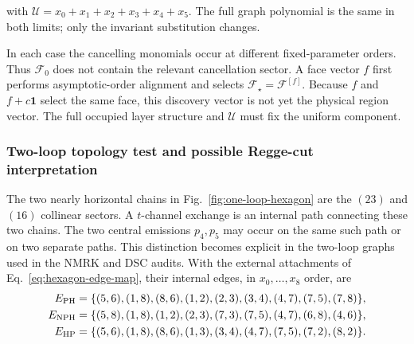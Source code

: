 \documentclass[a4paper,11pt]{article}
\begin{document}
with \(\mathcal U=x_0+x_1+x_2+x_3+x_4+x_5\).  The full graph polynomial is
the same in both limits; only the invariant substitution changes.

In each case the cancelling monomials occur at different fixed-parameter
orders.  Thus \(\mathcal F_0\) does not contain the relevant cancellation
sector.  A face vector \(f\) first performs asymptotic-order alignment and
selects \(\mathcal F_\star=\mathcal F^{[f]}\).  Because
\(f\) and \(f+c\boldsymbol1\) select the same face, this discovery vector is
not yet the physical region vector.  The full occupied layer structure and
\(\mathcal U\) must fix the uniform component.

\subsubsection{Two-loop topology test and possible Regge-cut interpretation}

The two nearly horizontal chains in Fig.~\ref{fig:one-loop-hexagon} are the
\((23)\) and \((16)\) collinear sectors.  A \(t\)-channel exchange is an
internal path connecting these two chains.  The two central emissions
\(p_4,p_5\) may occur on the same such path or on two separate paths.
This distinction becomes explicit in the two-loop graphs used in the NMRK
and DSC audits.  With the external attachments of
Eq.~\eqref{eq:hexagon-edge-map}, their internal edges, in
\(x_0,\ldots,x_8\) order, are
\begin{align}
 E_{\rm PH}={}&\{(5,6),(1,8),(8,6),(1,2),(2,3),
                   (3,4),(4,7),(7,5),(7,8)\},\nonumber\\
 E_{\rm NPH}={}&\{(5,8),(1,8),(1,2),(2,3),(7,3),
                   (7,5),(4,7),(6,8),(4,6)\},\nonumber\\
 E_{\rm HP}={}&\{(5,6),(1,8),(8,6),(1,3),(3,4),
                   (4,7),(7,5),(7,2),(8,2)\}.
 \label{eq:two-loop-six-point-edges}
\end{align}
\end{document}
